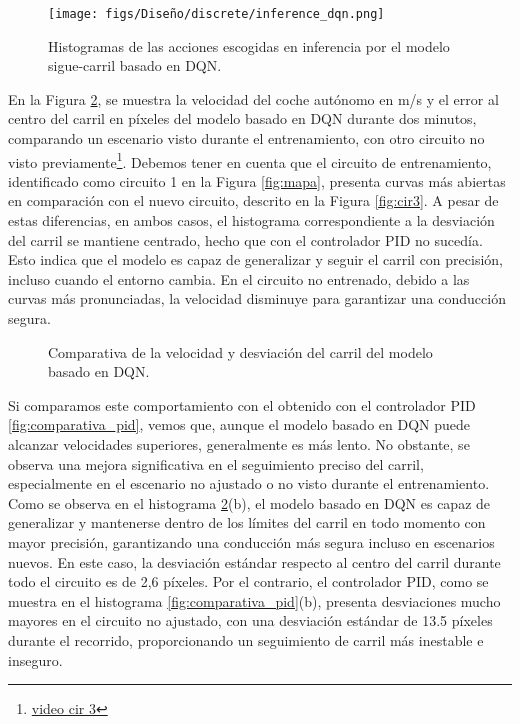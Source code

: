 \begin{figure}[ht]
\centering
\texttt{[image: figs/Diseño/discrete/inference\_dqn.png]}
\caption{Histogramas de las acciones escogidas en inferencia por el modelo sigue-carril basado en \ac{DQN}.}
\label{fig:inference_dqn}
\end{figure}

En la Figura \ref{fig:comparativa_dqn}, se muestra la velocidad del coche autónomo en m/s y el error al centro del carril en píxeles del modelo basado en \ac{DQN} durante dos minutos, comparando un escenario visto durante el entrenamiento\footnotemark[3], con otro circuito no visto previamente\footnote{\url{video cir 3}}. Debemos tener en cuenta que el circuito de entrenamiento, identificado como circuito 1 en la Figura \ref{fig:mapa}, presenta curvas más abiertas en comparación con el nuevo circuito, descrito en la Figura \ref{fig:cir3}. A pesar de estas diferencias, en ambos casos, el histograma correspondiente a la desviación del carril se mantiene centrado, hecho que con el controlador  \ac{PID} no sucedía. Esto indica que el modelo es capaz de generalizar y seguir el carril con precisión, incluso cuando el entorno cambia. En el circuito no entrenado, debido a las curvas más pronunciadas, la velocidad disminuye para garantizar una conducción segura.

\begin{figure}[ht]
\centering
{}
\hfill
{}
\caption{Comparativa de la velocidad y desviación del carril del modelo basado en \ac{DQN}.}
\label{fig:comparativa_dqn}
\end{figure}
\newpage

Si comparamos este comportamiento con el obtenido con el controlador \ac{PID} \ref{fig:comparativa_pid}, vemos que, aunque el modelo basado en \ac{DQN} puede alcanzar velocidades superiores, generalmente es más lento. No obstante, se observa una mejora significativa en el seguimiento preciso del carril, especialmente en el escenario no ajustado o no visto durante el entrenamiento. Como se observa en el histograma \ref{fig:comparativa_dqn}(b), el modelo basado en \ac{DQN} es capaz de generalizar y mantenerse dentro de los límites del carril en todo momento con mayor precisión, garantizando una conducción más segura incluso en escenarios nuevos. En este caso, la desviación estándar respecto al centro del carril durante todo el circuito es de 2,6 píxeles. Por el contrario, el controlador \ac{PID}, como se muestra en el histograma \ref{fig:comparativa_pid}(b), presenta desviaciones mucho mayores en el circuito no ajustado, con una desviación estándar de 13.5 píxeles durante el recorrido, proporcionando un seguimiento de carril más inestable e inseguro.

